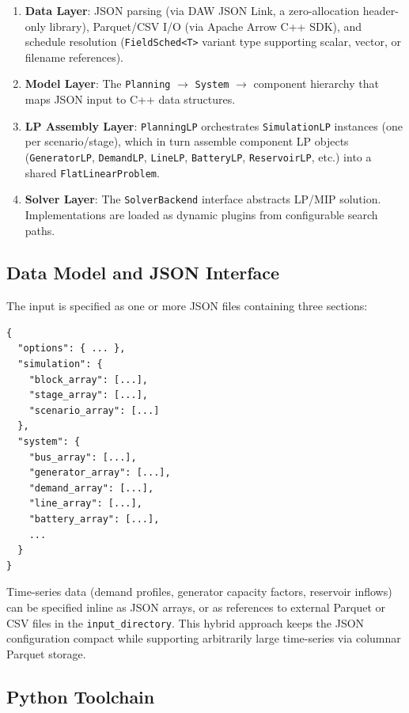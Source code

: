 \begin{enumerate}
  \item \textbf{Data Layer}: JSON parsing (via DAW JSON Link, a
    zero-allocation header-only library), Parquet/CSV I/O (via Apache
    Arrow C++ SDK), and schedule resolution (\texttt{FieldSched<T>}
    variant type supporting scalar, vector, or filename references).
  \item \textbf{Model Layer}: The \texttt{Planning} $\rightarrow$
    \texttt{System} $\rightarrow$ component hierarchy that maps JSON
    input to C++ data structures.
  \item \textbf{LP Assembly Layer}: \texttt{PlanningLP} orchestrates
    \texttt{SimulationLP} instances (one per scenario/stage), which in
    turn assemble component LP objects (\texttt{GeneratorLP},
    \texttt{DemandLP}, \texttt{LineLP}, \texttt{BatteryLP},
    \texttt{ReservoirLP}, etc.) into a shared
    \texttt{FlatLinearProblem}.
  \item \textbf{Solver Layer}: The \texttt{SolverBackend} interface
    abstracts LP/MIP solution.  Implementations are loaded as dynamic
    plugins from configurable search paths.
\end{enumerate}

\subsection{Data Model and JSON Interface}

The input is specified as one or more JSON files containing three sections:

\begin{lstlisting}[language={},caption={Top-level JSON structure}]
{
  "options": { ... },
  "simulation": {
    "block_array": [...],
    "stage_array": [...],
    "scenario_array": [...]
  },
  "system": {
    "bus_array": [...],
    "generator_array": [...],
    "demand_array": [...],
    "line_array": [...],
    "battery_array": [...],
    ...
  }
}
\end{lstlisting}

Time-series data (demand profiles, generator capacity factors, reservoir
inflows) can be specified inline as JSON arrays, or as references to
external Parquet or CSV files in the \texttt{input\_directory}.  This
hybrid approach keeps the JSON configuration compact while supporting
arbitrarily large time-series via columnar Parquet storage.

\subsection{Python Toolchain}

